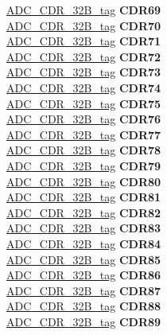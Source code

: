 \begin{DoxyCompactItemize}
\begin{tabbing}
\>\>\mbox{\hyperlink{unionADC__CDR__32B__tag}{ADC\_CDR\_32B\_tag}} {\bfseries CDR69}\\
\>\>\mbox{\hyperlink{unionADC__CDR__32B__tag}{ADC\_CDR\_32B\_tag}} {\bfseries CDR70}\\
\>\>\mbox{\hyperlink{unionADC__CDR__32B__tag}{ADC\_CDR\_32B\_tag}} {\bfseries CDR71}\\
\>\>\mbox{\hyperlink{unionADC__CDR__32B__tag}{ADC\_CDR\_32B\_tag}} {\bfseries CDR72}\\
\>\>\mbox{\hyperlink{unionADC__CDR__32B__tag}{ADC\_CDR\_32B\_tag}} {\bfseries CDR73}\\
\>\>\mbox{\hyperlink{unionADC__CDR__32B__tag}{ADC\_CDR\_32B\_tag}} {\bfseries CDR74}\\
\>\>\mbox{\hyperlink{unionADC__CDR__32B__tag}{ADC\_CDR\_32B\_tag}} {\bfseries CDR75}\\
\>\>\mbox{\hyperlink{unionADC__CDR__32B__tag}{ADC\_CDR\_32B\_tag}} {\bfseries CDR76}\\
\>\>\mbox{\hyperlink{unionADC__CDR__32B__tag}{ADC\_CDR\_32B\_tag}} {\bfseries CDR77}\\
\>\>\mbox{\hyperlink{unionADC__CDR__32B__tag}{ADC\_CDR\_32B\_tag}} {\bfseries CDR78}\\
\>\>\mbox{\hyperlink{unionADC__CDR__32B__tag}{ADC\_CDR\_32B\_tag}} {\bfseries CDR79}\\
\>\>\mbox{\hyperlink{unionADC__CDR__32B__tag}{ADC\_CDR\_32B\_tag}} {\bfseries CDR80}\\
\>\>\mbox{\hyperlink{unionADC__CDR__32B__tag}{ADC\_CDR\_32B\_tag}} {\bfseries CDR81}\\
\>\>\mbox{\hyperlink{unionADC__CDR__32B__tag}{ADC\_CDR\_32B\_tag}} {\bfseries CDR82}\\
\>\>\mbox{\hyperlink{unionADC__CDR__32B__tag}{ADC\_CDR\_32B\_tag}} {\bfseries CDR83}\\
\>\>\mbox{\hyperlink{unionADC__CDR__32B__tag}{ADC\_CDR\_32B\_tag}} {\bfseries CDR84}\\
\>\>\mbox{\hyperlink{unionADC__CDR__32B__tag}{ADC\_CDR\_32B\_tag}} {\bfseries CDR85}\\
\>\>\mbox{\hyperlink{unionADC__CDR__32B__tag}{ADC\_CDR\_32B\_tag}} {\bfseries CDR86}\\
\>\>\mbox{\hyperlink{unionADC__CDR__32B__tag}{ADC\_CDR\_32B\_tag}} {\bfseries CDR87}\\
\>\>\mbox{\hyperlink{unionADC__CDR__32B__tag}{ADC\_CDR\_32B\_tag}} {\bfseries CDR88}\\
\>\>\mbox{\hyperlink{unionADC__CDR__32B__tag}{ADC\_CDR\_32B\_tag}} {\bfseries CDR89}\\

\end{tabbing}
\end{DoxyCompactItemize}
